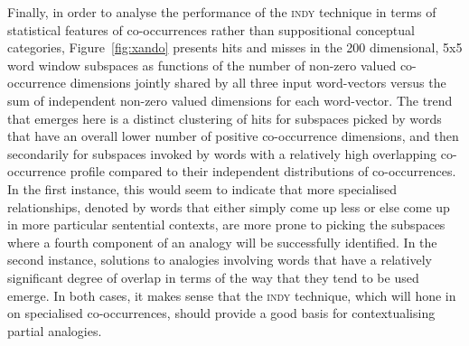 Finally, in order to analyse the performance of the \textsc{indy} technique in terms of statistical features of co-occurrences rather than suppositional conceptual categories, Figure~\ref{fig:xando} presents hits and misses in the 200 dimensional, 5x5 word window subspaces as functions of the number of non-zero valued co-occurrence dimensions jointly shared by all three input word-vectors versus the sum of independent non-zero valued dimensions for each word-vector.  The trend that emerges here is a distinct clustering of hits for subspaces picked by words that have an overall lower number of positive co-occurrence dimensions, and then secondarily for subspaces invoked by words with a relatively high overlapping co-occurrence profile compared to their independent distributions of co-occurrences.  In the first instance, this would seem to indicate that more specialised relationships, denoted by words that either simply come up less or else come up in more particular sentential contexts, are more prone to picking the subspaces where a fourth component of an analogy will be successfully identified.  In the second instance, solutions to analogies involving words that have a relatively significant degree of overlap in terms of the way that they tend to be used emerge.  In both cases, it makes sense that the \textsc{indy} technique, which will hone in on specialised co-occurrences, should provide a good basis for contextualising partial analogies.


